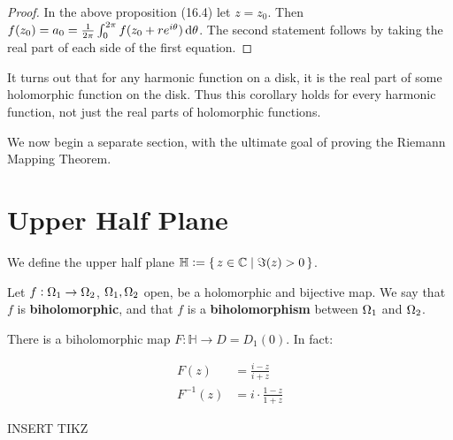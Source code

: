 \begin{proof}
In the above proposition (16.4) let $z=z_0$. Then $f(z_0) = a_0 = \frac{1}{2 \pi} \int_0^{2 \pi} f( z_0 + r e^{i \theta} ) \dif \theta$. The second statement follows by taking the real part of each side of the first equation.
\end{proof}


\begin{remark}
It turns out that for any harmonic function on a disk, it is the real part of some holomorphic function on the disk. Thus this corollary holds for every harmonic function, not just the real parts of holomorphic functions.
\end{remark}

We now begin a separate section, with the ultimate goal of proving the Riemann Mapping Theorem.

\section{Upper Half Plane}

\begin{definition}
We define the upper half plane $\mathbb{H} \vcentcolon = \set{z \in \mathbb{C}\mid \Im (z) > 0}$.

\end{definition}


\begin{definition}
Let $f: \Omega_1 \to \Omega_2$, $\Omega_1, \Omega_2$ open, be a holomorphic and bijective map. We say that $f$ is \textbf{biholomorphic}, and that $f$ is a \textbf{biholomorphism} between $\Omega_1$ and $\Omega_2$.
\end{definition}

\begin{proposition}
There is a biholomorphic map $F: \mathbb{H} \to D = D_1 (0)$. In fact:

\begin{align*}
    F(z) &= \frac{i-z}{i+z}\\
    F^{-1}(z) &= i \cdot \frac{1-z}{1+z}
\end{align*}
\end{proposition}

INSERT TIKZ


